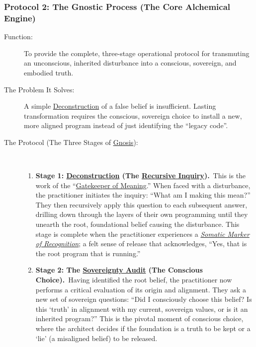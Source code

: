 \documentclass{article}
\begin{document}
\subsubsection*{Protocol 2: The Gnostic Process (The Core Alchemical Engine)}
\begin{description}
    \item[Function:] To provide the complete, three-stage operational protocol for transmuting an unconscious, inherited disturbance into a conscious, sovereign, and embodied truth.
    \item[The Problem It Solves:] A simple \hyperlink{gloss:deconstruction}{Deconstruction} of a false belief is insufficient. Lasting transformation requires the conscious, sovereign choice to install a new, more aligned program instead of just identifying the ``legacy code''.
    \item[The Protocol (The Three Stages of \hyperlink{gloss:gnosis}{Gnosis}):]~
    \begin{enumerate}[label={}]
        \item \textbf{Stage 1: \hyperlink{gloss:deconstruction}{Deconstruction} (The \hyperlink{gloss:recursive_inquiry}{Recursive Inquiry}).}~\newline\newline This is the work of the ``\hyperlink{gloss:gatekeeper_of_meaning}{Gatekeeper of Meaning}.'' When faced with a disturbance, the practitioner initiates the inquiry: ``What am I making this mean?'' They then recursively apply this question to each subsequent answer, drilling down through the layers of their own programming until they unearth the root, foundational belief causing the disturbance. This stage is complete when the practitioner experiences a \textit{\hyperlink{gloss:somatic_marker_of_recognition}{Somatic Marker of Recognition}}; a felt sense of release that acknowledges, ``Yes, that is the root program that is running.''
        \newline 
        \item \textbf{Stage 2: The \hyperlink{gloss:sovereignty_audit}{Sovereignty Audit} (The Conscious Choice).}~\newline\newline Having identified the root belief, the practitioner now performs a critical evaluation of its origin and alignment. They ask a new set of sovereign questions: ``Did I consciously choose this belief? Is this `truth' in alignment with my current, sovereign values, or is it an inherited program?'' This is the pivotal moment of conscious choice, where the architect decides if the foundation is a truth to be kept or a `lie' (a misaligned belief) to be released.

\end{enumerate}
\end{description}
\end{document}

